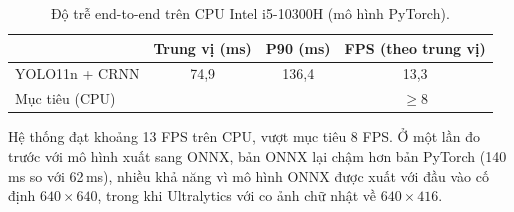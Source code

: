 \begin{table}[H]
\centering
\caption{Độ trễ end-to-end trên CPU Intel i5-10300H (mô hình PyTorch).}
\label{tab:speed}
\begin{tabular}{lccc}
\toprule
 & Trung vị (ms) & P90 (ms) & FPS (theo trung vị) \\
\midrule
YOLO11n + CRNN & 74,9 & 136,4 & 13,3 \\
\midrule
Mục tiêu (CPU) & & & $\geq 8$ \\
\bottomrule
\end{tabular}
\end{table}

Hệ thống đạt khoảng 13 FPS trên CPU, vượt mục tiêu 8 FPS. Ở một lần đo trước với mô hình xuất sang ONNX, bản ONNX lại chậm hơn bản PyTorch (140\,ms so với 62\,ms), nhiều khả năng vì mô hình ONNX được xuất với đầu vào cố định $640\times640$, trong khi Ultralytics với  co ảnh chữ nhật về $640\times416$.
